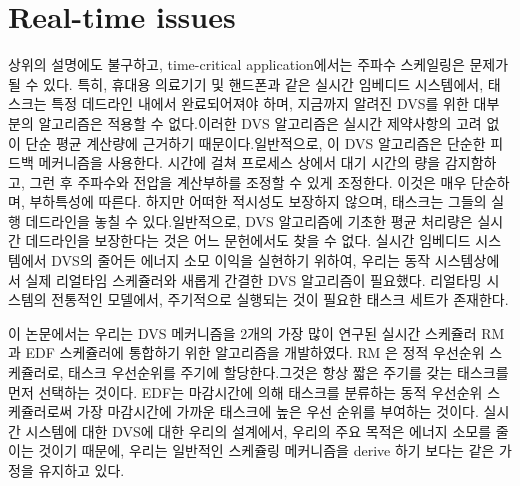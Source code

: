 \documentclass[11pt
  , a4paper
  , article
  , oneside
]{memoir}
\begin{document}
\section{Real-time issues}
상위의 설명에도 불구하고, time-critical application에서는 주파수 스케일링은 문제가 될 수 있다. 특히, 휴대용 의료기기 및 핸드폰과 같은 실시간 임베디드 시스템에서, 태스크는 특정 데드라인 내에서 완료되어져야 하며, 지금까지 알려진 DVS를 위한 대부분의 알고리즘은 적용할 수 없다.이러한 DVS 알고리즘은 실시간 제약사항의 고려 없이 단순 평균 계산량에 근거하기 때문이다.일반적으로, 이 DVS 알고리즘은 단순한 피드백 메커니즘을 사용한다. 시간에 걸쳐 프로세스 상에서 대기 시간의 량을 감지함하고, 그런 후 주파수와 전압을 계산부하를 조정할 수 있게 조정한다. 이것은 매우 단순하며, 부하특성에 따른다. 하지만 어떠한 적시성도 보장하지 않으며, 태스크는 그들의 실행 데드라인을 놓칠 수 있다.일반적으로, DVS 알고리즘에 기초한 평균 처리량은 실시간 데드라인을 보장한다는 것은 어느 문헌에서도 찾을 수 없다. 실시간 임베디드 시스템에서 DVS의 줄어든 에너지 소모 이익을 실현하기 위하여, 우리는 동작 시스템상에서 실제 리얼타임 스케쥴러와 새롭게 간결한 DVS 알고리즘이 필요했다. 리얼타밍 시스템의 전통적인 모델에서, 주기적으로 실행되는 것이 필요한 태스크 세트가 존재한다. 

이 논문에서는 우리는 DVS 메커니즘을 2개의 가장 많이 연구된 실시간 스케쥴러 
RM 과 EDF 스케쥴러에 통합하기 위한 알고리즘을 개발하였다. RM 은 정적 우선순위 스케쥴러로, 태스크 우선순위를 주기에 할당한다.그것은 항상 짧은 주기를 갖는 태스크를 먼저 선택하는 것이다. EDF는 마감시간에 의해 태스크를 분류하는 동적 우선순위 스케쥴러로써 가장 마감시간에 가까운 태스크에 높은 우선 순위를 부여하는 것이다.
실시간 시스템에 대한 DVS에 대한 우리의 설계에서, 우리의 주요 목적은 에너지 소모를 줄이는 것이기 때문에,  우리는 일반적인 스케쥴링 메커니즘을 derive 하기 보다는 같은 가정을 유지하고 있다.  
\end{document}
